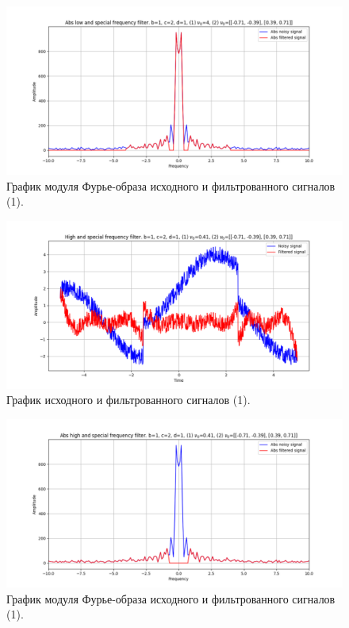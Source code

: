 \documentclass[a4paper, 12pt]{article}
\begin{document}
    \begin{figure}[!htb]
        \centering
        \includegraphics[scale=0.48]{1_3_abs_u_U_nospec.png}
        \captionsetup{skip=0pt}
        \caption{График модуля Фурье-образа исходного и фильтрованного сигналов (1).}
        \label{fig:fig78}
    \end{figure}
    \begin{figure}[!htb]
        \centering
        \includegraphics[scale=0.48]{1_4_u_flt_u_nospec.png}
        \captionsetup{skip=0pt}
        \caption{График исходного и фильтрованного сигналов (1).}
        \label{fig:fig79}
    \end{figure}
    \begin{figure}[!htb]
        \centering
        \includegraphics[scale=0.48]{1_4_abs_u_U_nospec.png}
        \captionsetup{skip=0pt}
        \caption{График модуля Фурье-образа исходного и фильтрованного сигналов (1).}
        \label{fig:fig80}
    \end{figure}
\end{document}
